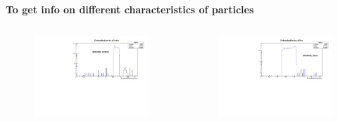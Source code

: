 \documentclass[dvipsnames] {beamer}
\begin{document}
\begin{frame}
\begin{block}{\bf \centering \tiny To get info on different characteristics of particles}
\begin{columns}[t]
            \begin{figure}[H]
              \includegraphics[width=1.\linewidth]{EmbeddingMonitorMomentaProton.pdf}
           \end{figure}      
           \begin{figure}[H]
              \includegraphics[width=1.\linewidth]{EmbeddingMonitorMomentaPion.pdf}
           \end{figure}
         \end{columns}
         \end{block}
       \end{frame}
\end{document}
